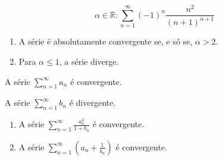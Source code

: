 \documentclass[11pt, a4paper]{article}
\begin{document}
\clearpage


\begin{equation}
	\alpha \in \mathbb{R}: \sum_{n=1}^{\infty}
	(-1)^n \frac{n^2}{(n + 1)^{\alpha + 1}}
\end{equation}

\begin{enumerate}[label=\arabic{section}.\arabic*.]
	\item
		\begin{proposition}
			A série é absolutamente convergente se, e só se, $\alpha > 2$.
		\end{proposition}
	\item
		\begin{proposition}
			Para $\alpha \leq 1$, a série diverge.
		\end{proposition}
\end{enumerate}


\begin{proposition}\label{prop:af1-ex8-an-convergente}
	A série $\sum_{n=1}^{\infty} a_n$ é convergente.
\end{proposition}

\begin{proposition}\label{prop:af1-ex8-bn-divergente}
	A série $\sum_{n=1}^{\infty} b_n$ é divergente.
\end{proposition}


\begin{enumerate}[label=\arabic{section}.\arabic*.]
	\item
		\begin{proposition}
			A série $\sum_{n=1}^{\infty} \frac{a_n^2}{1 + b_n}$ é convergente.
		\end{proposition}
	\item
		\begin{proposition}
			A série $\sum_{n=1}^{\infty} \left(a_n + \frac{1}{b_n}\right)$ é convergente.
		\end{proposition}
\end{enumerate}

\end{document}
